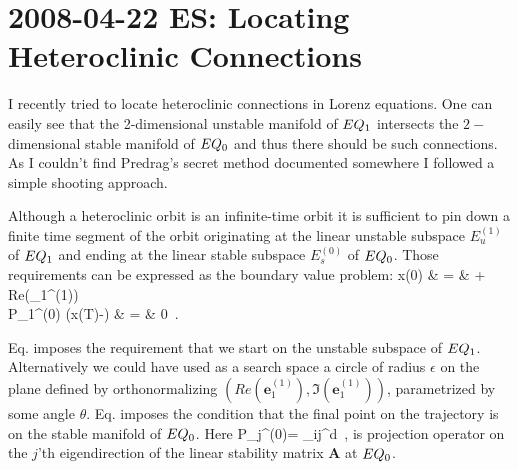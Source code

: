 \section{2008-04-22 ES: Locating Heteroclinic Connections}

I recently tried to locate heteroclinic connections in Lorenz equations. One
can easily see that the 2-dimensional unstable manifold of $EQ_{1}$ intersects the
$2-$dimensional stable manifold of $EQ_{0}$ and thus there should be such connections.
As I couldn't find Predrag's secret method documented somewhere I followed a simple
shooting approach.

Although a heteroclinic orbit is an infinite-time orbit it is sufficient to
pin down a finite time segment of the orbit originating at the linear unstable subspace $E_u^{(1)}$
of $EQ_{1}$ and ending at the linear stable subspace $E_s^{(0)}$ of $EQ_{0}$. Those
requirements can be expressed as the boundary value problem:
\bea
	x(0) & = & + \epsilon Re(_1^{(1)}) \, \label{eq:shootHetIC} \\
	P_1^{(0)} (x(T)-) & = &  0 \,. \label{eq:shootHetBC}
\eea

Eq.  imposes the requirement that we start on the unstable subspace of $EQ_{1}$.
Alternatively we could have used as a search space a circle of radius $\epsilon$ on the plane defined
by orthonormalizing $\left(Re(\mathbf{e}_1^{(1)}),\Im(\mathbf{e}_1^{(1)})\right)$, parametrized by some
angle $\theta$. Eq.  imposes the condition that the final point on the trajectory is
on the stable manifold of $EQ_{0}$. Here
\beq
	P_j^{(0)}= \prod_{i\neq j}^d \,,
\eeq
is projection operator on the $j$'th eigendirection of the linear stability matrix $\mathbf{A}$ at $EQ_{0}$.

